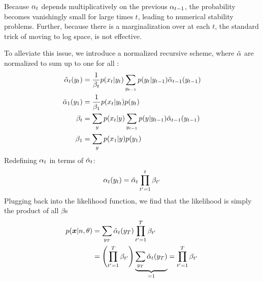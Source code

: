 Because $\alpha_{t}$ depends multiplicatively on the previous $\alpha_{t-1}$,
the probability becomes vanishingly small for large times $t$, leading to
numerical stability problems. Further, because there is a marginalization over
\states at each $t$, the standard trick of moving to log space, is not
effective.

To alleviate this issue, we introduce a normalized recursive scheme, where
$\tilde{\alpha}$ are normalized to sum up to one for all \y{}:
%
\begin{align*}
  \tilde{\alpha}_t(y_{t}) &=
    \frac{1}{\beta_t}
    p(x_{t}|y_{t})
    \sum_{y_{t-1}}
      p(y_{t} | y_{t-1})
      \tilde{\alpha}_{t-1}(y_{t-1})\\
  \tilde{\alpha}_{1}(y_{1}) &=
    \frac{1}{\beta_1}
    p(x_{t}|y_{t})
    p(y_{t})\\
  \beta_t &=
    \sum_{y_{}}
    p(x_{t}|y_{})
    \sum_{y_{t-1}}
      p(y_{} | y_{t-1})
      \tilde{\alpha}_{t-1}(y_{t-1})\\
  \beta_1 &=
    \sum_{y_{}}
    p(x_{1}|y_{})
    p(y_{1})\\
\end{align*}
%
Redefining $\alpha_{t}$ in terms of $\tilde{\alpha}_{t}$:
%
\begin{equation*}
  \alpha_t(y_{t}) = \tilde{\alpha}_t \prod_{t'=1}^t \beta_{t'}
\end{equation*}
Plugging back into the likelihood function, we find that the likelihood is simply the product of all $\beta$s 
\begin{align*}
  p(\bm{x}|n,\theta)
    &= \sum_{y_{T}} \tilde{\alpha}_{t}(y_{T}) \prod_{t'=1}^T \beta_{t'}\\
    &= \left( \prod_{t'=1}^T \beta_{t'} \right)
      \underbrace{\sum_{y_{T}} \tilde{\alpha}_{t}(y_{T})}_{=1}
    = \prod_{t'=1}^T \beta_{t'}\\
\end{align*}

